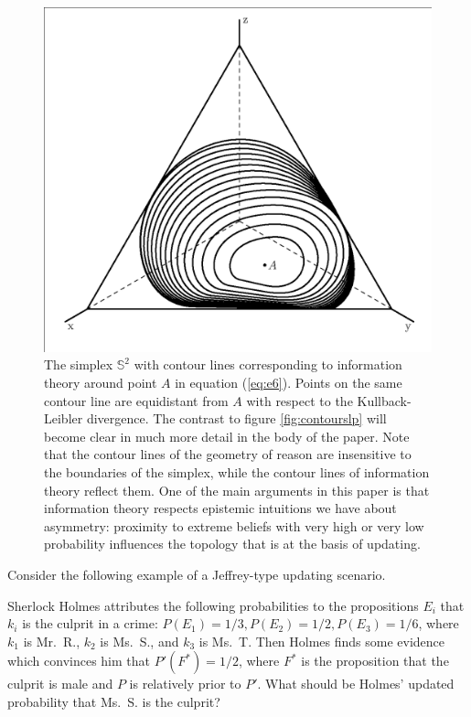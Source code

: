 \documentclass[smallextended]{svjour3}       %
\begin{document}
\begin{figure}[ht]
  \begin{flushright}
    \begin{minipage}[h]{.7\linewidth}
      \includegraphics[width=\textwidth]{crj.eps}
      \caption{\footnotesize The simplex $\mathbb{S}^{2}$ with contour
        lines corresponding to information theory around point $A$ in
        equation (\ref{eq:e6}). Points on the same contour line are
        equidistant from $A$ with respect to the Kullback-Leibler
        divergence. The contrast to figure \ref{fig:contourslp} will
        become clear in much more detail in the body of the paper.
        Note that the contour lines of the geometry of reason are
        insensitive to the boundaries of the simplex, while the
        contour lines of information theory reflect them. One of the
        main arguments in this paper is that information theory
        respects epistemic intuitions we have about asymmetry:
        proximity to extreme beliefs with very high or very low
        probability influences the topology that is at the basis of
        updating.}
      \label{fig:contoursrj}
    \end{minipage}
  \end{flushright}
\end{figure}

Consider the following example of a Jeffrey-type updating scenario.

\begin{quotex}
  \label{ex:holmes} Sherlock Holmes
  attributes the following probabilities to the propositions $E_{i}$
  that $k_{i}$ is the culprit in a crime:
  $P(E_{1})=1/3,P(E_{2})=1/2,P(E_{3})=1/6$, where $k_{1}$ is Mr.\ R.,
  $k_{2}$ is Ms.\ S., and $k_{3}$ is Ms.\ T. Then Holmes finds some
  evidence which convinces him that $P'(F^{*})=1/2$, where $F^{*}$ is
  the proposition that the culprit is male and $P$ is relatively prior
  to $P'$. What should be Holmes' updated probability that Ms.\ S. is
  the culprit?
\end{quotex}
\end{document}

